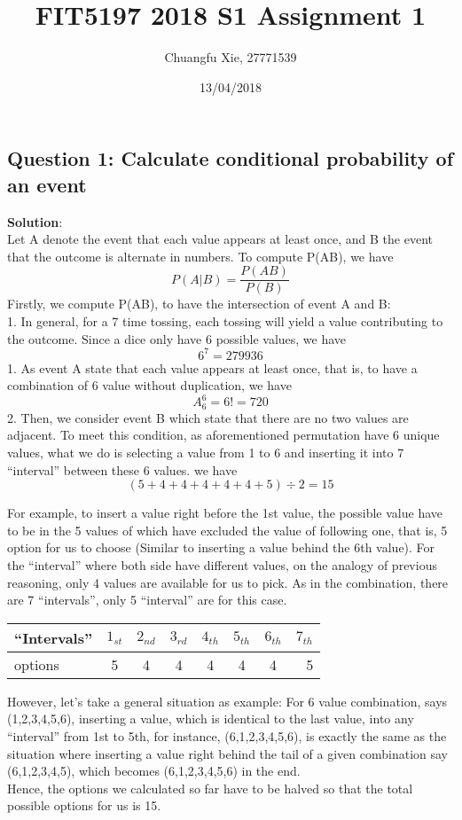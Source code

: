 \documentclass[]{article}
\title{FIT5197 2018 S1 Assignment 1}
\author{Chuangfu Xie, 27771539}
\date{13/04/2018}
\begin{document}
\maketitle

\subsection{Question 1: Calculate conditional probability of an
event}\label{question-1-calculate-conditional-probability-of-an-event}

\textbf{Solution}:\\
Let A denote the event that each value appears at least once, and B the
event that the outcome is alternate in numbers. To compute
P(A\textbar{}B), we have\\
\[ P(A|B)=\frac { P(AB) }{ P(B) } \] Firstly, we compute P(AB), to have
the intersection of event A and B:\\
1. In general, for a 7 time tossing, each tossing will yield a value
contributing to the outcome. Since a dice only have 6 possible values,
we have \[ { 6 }^{ 7 }=279936 \] 1. As event A state that each value
appears at least once, that is, to have a combination of 6 value without
duplication, we have \[ { A }_{ 6 }^{ 6 }=6!=720 \] 2. Then, we consider
event B which state that there are no two values are adjacent. To meet
this condition, as aforementioned permutation have 6 unique values, what
we do is selecting a value from 1 to 6 and inserting it into 7
``interval'' between these 6 values. we have
\[ (5+4+4+4+4+4+5)\div2=15 \]

For example, to insert a value right before the 1st value, the possible
value have to be in the 5 values of which have excluded the value of
following one, that is, 5 option for us to choose (Similar to inserting
a value behind the 6th value). For the ``interval'' where both side have
different values, on the analogy of previous reasoning, only 4 values
are available for us to pick. As in the combination, there are 7
``intervals'', only 5 ``interval'' are for this case.

\begin{longtable}[]{@{}lccccccr@{}}
\toprule
``Intervals'' & \({1}_{st}\) & \({2}_{nd}\) & \({3}_{rd}\) &
\({4}_{th}\) & \({5}_{th}\) & \({6}_{th}\) & \({7}_{th}\)\tabularnewline
\midrule
\endhead
options & 5 & 4 & 4 & 4 & 4 & 4 & 5\tabularnewline
\bottomrule
\end{longtable}

However, let's take a general situation as example: For 6 value
combination, says (1,2,3,4,5,6), inserting a value, which is identical
to the last value, into any ``interval'' from 1st to 5th, for instance,
(6,1,2,3,4,5,6), is exactly the same as the situation where inserting a
value right behind the tail of a given combination say (6,1,2,3,4,5),
which becomes (6,1,2,3,4,5,6) in the end.\\
Hence, the options we calculated so far have to be halved so that the
total possible options for us is 15.
\end{document}
